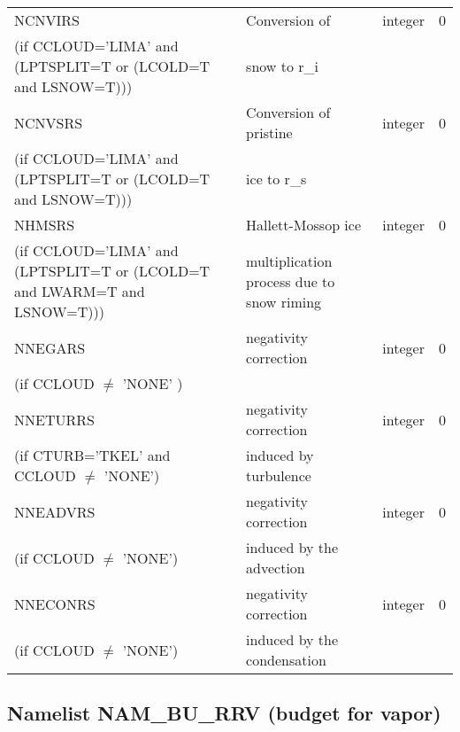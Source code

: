 \begin{longtable} {|p{}|p{}|>{\centering}p{}|p{}<{\centering}|}
NCNVIRS  &Conversion of    & integer  &  0 \index{NCNVIRS!\innam{NAM\_BU\_RRS}}\\ \nopagebreak
(if CCLOUD='LIMA' and (LPTSPLIT=T or (LCOLD=T and LSNOW=T))) & snow to r\_i&   &  \\\hline
NCNVSRS  & Conversion of pristine  & integer  &  0 \index{NCNVSRS!\innam{NAM\_BU\_RRS}}\\ \nopagebreak
(if CCLOUD='LIMA' and (LPTSPLIT=T or (LCOLD=T and LSNOW=T))) & ice to r\_s &   &  \\\hline
NHMSRS  &Hallett-Mossop ice  & integer  &  0 \index{NHMSRS!\innam{NAM\_BU\_RRS}}\\ \nopagebreak
(if CCLOUD='LIMA' and (LPTSPLIT=T or (LCOLD=T and LWARM=T and LSNOW=T))) & multiplication process due to snow riming &   &  \\\hline
NNEGARS   & negativity correction & integer  &  0 \index{NNEGARS!\innam{NAM\_BU\_RRS}}\\ \nopagebreak
(if CCLOUD $\neq$ 'NONE' )& &   &  \\\hline
NNETURRS  &negativity correction   & integer  &  0 \index{NNETURRS!\innam{NAM\_BU\_RRS}}\\ \nopagebreak
(if CTURB='TKEL' and CCLOUD $\neq$ 'NONE')   &induced by turbulence   &       &   \\\hline
NNEADVRS  & negativity correction  & integer  &  0 \index{NNEADVRS!\innam{NAM\_BU\_RRS}}\\ \nopagebreak
(if CCLOUD $\neq$ 'NONE') & induced by the advection&   &  \\\hline
NNECONRS  &negativity correction    & integer  &  0 \index{NNECONRS!\innam{NAM\_BU\_RRS}}\\ \nopagebreak
(if CCLOUD $\neq$ 'NONE') &induced by the condensation &   &  \\\hline
\end{longtable}

\subsection{Namelist NAM\_BU\_RRV (budget for  vapor)}

